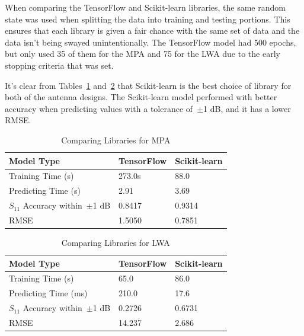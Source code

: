 \documentclass[conference]{IEEEtran}
\begin{document}
When comparing the TensorFlow and Scikit-learn libraries, the same random state was used when splitting the data into training and testing portions. This ensures that each library is given a fair chance with the same set of data and the data isn't being swayed unintentionally. The TensorFlow model had 500 epochs, but only used 35 of them for the MPA and 75 for the LWA due to the early stopping criteria that was set. 

It's clear from Tables~\ref{comparing_libraries_p} and~\ref{comparing_libraries_lw} that Scikit-learn is the best choice of library for both of the antenna designs. The Scikit-learn model performed with better accuracy when predicting values with a tolerance of~$\pm$1 dB, and it has a lower RMSE.

\begin{table}[h]
\caption{Comparing Libraries for MPA}
\begin{center}
\begin{tabular}{ |l|l|l| }
    \hline
    Model Type & TensorFlow & Scikit-learn \\ 
    \hline
    Training Time (s) & 273.0s & 88.0 \\  
    \hline
    Predicting Time (s) & 2.91 & 3.69 \\
    \hline
    $S_{11}$ Accuracy within~$\pm$1 dB & 0.8417 & 0.9314 \\
    \hline
    RMSE & 1.5050 & 0.7851 \\
    \hline
\end{tabular}
\end{center}
\label{comparing_libraries_p}
\end{table}

\begin{table}[h]
\caption{Comparing Libraries for LWA}
\begin{center}
\begin{tabular}{ |l|l|l| }
    \hline
    Model Type & TensorFlow & Scikit-learn \\ 
    \hline
    Training Time (s) & 65.0 & 86.0 \\  
    \hline
    Predicting Time (ms) & 210.0 & 17.6 \\
    \hline
    $S_{11}$ Accuracy within~$\pm$1 dB & 0.2726 & 0.6731 \\
    \hline
    RMSE & 14.237 & 2.686 \\
    \hline
\end{tabular}
\end{center}
\label{comparing_libraries_lw}
\end{table}
\end{document}
